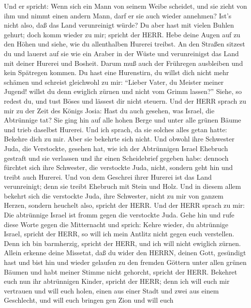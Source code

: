  Und er spricht: Wenn sich ein Mann von seinem Weibe
scheidet, und sie zieht von ihm und nimmt einen andern Mann, darf er sie
auch wieder annehmen? Ist's nicht also, daß das Land verunreinigt würde?
Du aber hast mit vielen Buhlen gehurt; doch komm wieder zu mir; spricht
der HERR.  Hebe deine Augen auf zu den Höhen und siehe, wie
du allenthalben Hurerei treibst. An den Straßen sitzest du und lauerst
auf sie wie ein Araber in der Wüste und verunreinigst das Land mit
deiner Hurerei und Bosheit.  Darum muß auch der Frühregen
ausbleiben und kein Spätregen kommen. Du hast eine Hurenstirn, du willst
dich nicht mehr schämen  und schreist gleichwohl zu mir:
``Lieber Vater, du Meister meiner Jugend!  willst du denn
ewiglich zürnen und nicht vom Grimm lassen?'' Siehe, so redest du, und
tust Böses und lässest dir nicht steuern.  Und der HERR
sprach zu mir zu der Zeit des Königs Josia: Hast du auch gesehen, was
Israel, die Abtrünnige tat? Sie ging hin auf alle hohen Berge und unter
alle grünen Bäume und trieb daselbst Hurerei.  Und ich
sprach, da sie solches alles getan hatte: Bekehre dich zu mir. Aber sie
bekehrte sich nicht. Und obwohl ihre Schwester Juda, die Verstockte,
gesehen hat,  wie ich der Abtrünnigen Israel Ehebruch
gestraft und sie verlassen und ihr einen Scheidebrief gegeben habe:
dennoch fürchtet sich ihre Schwester, die verstockte Juda, nicht,
sondern geht hin und treibt auch Hurerei.  Und von dem
Geschrei ihrer Hurerei ist das Land verunreinigt; denn sie treibt
Ehebruch mit Stein und Holz.  Und in diesem allem bekehrt
sich die verstockte Juda, ihre Schwester, nicht zu mir von ganzem
Herzen, sondern heuchelt also, spricht der HERR.  Und der
HERR sprach zu mir: Die abtrünnige Israel ist fromm gegen die verstockte
Juda.  Gehe hin und rufe diese Worte gegen die Mitternacht
und sprich: Kehre wieder, du abtrünnige Israel, spricht der HERR, so
will ich mein Antlitz nicht gegen euch verstellen. Denn ich bin
barmherzig, spricht der HERR, und ich will nicht ewiglich zürnen.
 Allein erkenne deine Missetat, daß du wider den HERRN,
deinen Gott, gesündigt hast und bist hin und wieder gelaufen zu den
fremden Göttern unter allen grünen Bäumen und habt meiner Stimme nicht
gehorcht, spricht der HERR.  Bekehret euch nun ihr
abtrünnigen Kinder, spricht der HERR; denn ich will euch mir vertrauen
und will euch holen, einen aus einer Stadt und zwei aus einem
Geschlecht, und will euch bringen gen Zion  und will euch
